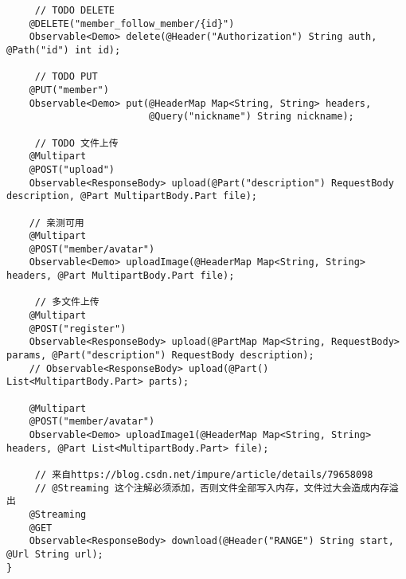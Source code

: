 \documentclass[9pt, b5paper]{article}
\begin{document}
\begin{verbatim}
     // TODO DELETE
    @DELETE("member_follow_member/{id}")
    Observable<Demo> delete(@Header("Authorization") String auth, @Path("id") int id);

     // TODO PUT
    @PUT("member")
    Observable<Demo> put(@HeaderMap Map<String, String> headers,
                         @Query("nickname") String nickname);

     // TODO 文件上传
    @Multipart
    @POST("upload")
    Observable<ResponseBody> upload(@Part("description") RequestBody description, @Part MultipartBody.Part file);

    // 亲测可用
    @Multipart
    @POST("member/avatar")
    Observable<Demo> uploadImage(@HeaderMap Map<String, String> headers, @Part MultipartBody.Part file);

     // 多文件上传
    @Multipart
    @POST("register")
    Observable<ResponseBody> upload(@PartMap Map<String, RequestBody> params, @Part("description") RequestBody description);
    // Observable<ResponseBody> upload(@Part() List<MultipartBody.Part> parts);

    @Multipart
    @POST("member/avatar")
    Observable<Demo> uploadImage1(@HeaderMap Map<String, String> headers, @Part List<MultipartBody.Part> file);

     // 来自https://blog.csdn.net/impure/article/details/79658098
     // @Streaming 这个注解必须添加，否则文件全部写入内存，文件过大会造成内存溢出
    @Streaming
    @GET
    Observable<ResponseBody> download(@Header("RANGE") String start, @Url String url);
}
\end{verbatim}
\end{document}
